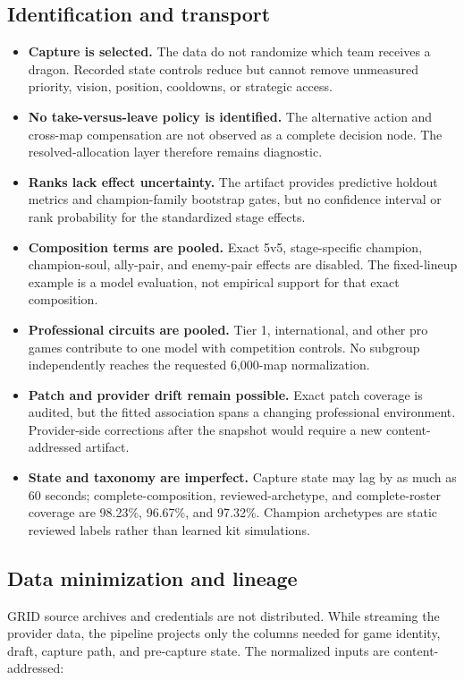 \documentclass[10pt,letterpaper]{article}
\begin{document}
\subsection{Identification and transport}
\begin{itemize}
\item \textbf{Capture is selected.} The data do not randomize which team receives a dragon. Recorded state controls reduce but cannot remove unmeasured priority, vision, position, cooldowns, or strategic access.
\item \textbf{No take-versus-leave policy is identified.} The alternative action and cross-map compensation are not observed as a complete decision node. The resolved-allocation layer therefore remains diagnostic.
\item \textbf{Ranks lack effect uncertainty.} The artifact provides predictive holdout metrics and champion-family bootstrap gates, but no confidence interval or rank probability for the standardized stage effects.
\item \textbf{Composition terms are pooled.} Exact 5v5, stage-specific champion, champion-soul, ally-pair, and enemy-pair effects are disabled. The fixed-lineup example is a model evaluation, not empirical support for that exact composition.
\item \textbf{Professional circuits are pooled.} Tier 1, international, and other pro games contribute to one model with competition controls. No subgroup independently reaches the requested 6,000-map normalization.
\item \textbf{Patch and provider drift remain possible.} Exact patch coverage is audited, but the fitted association spans a changing professional environment. Provider-side corrections after the snapshot would require a new content-addressed artifact.
\item \textbf{State and taxonomy are imperfect.} Capture state may lag by as much as 60 seconds; complete-composition, reviewed-archetype, and complete-roster coverage are 98.23\%, 96.67\%, and 97.32\%. Champion archetypes are static reviewed labels rather than learned kit simulations.
\end{itemize}

\subsection{Data minimization and lineage}
GRID source archives and credentials are not distributed. While streaming the provider data, the pipeline projects only the columns needed for game identity, draft, capture path, and pre-capture state. The normalized inputs are content-addressed:
\end{document}
